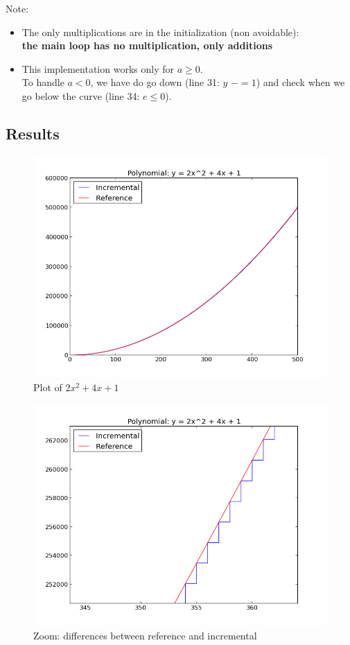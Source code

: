 \documentclass[a4paper,10pt]{article}
\begin{document}
\bigskip \noindent
Note:
\begin{itemize}
	\item The only multiplications are in the initialization (non avoidable): \\
	 \textbf{the main loop has no multiplication, only additions}
	\item This implementation works only for $a \ge 0$.
	\\To handle $a < 0$, we have do go down (line 31: $y$ $-$$= 1$) and check when we go below the curve (line 34: $e \le 0$).
\end{itemize}


\newpage
\subsection{Results}

\begin{figure}[!htb]\centering
    \includegraphics[width=0.8\linewidth]{./images/plot.png}
    \caption{\small{Plot of $2x^2 + 4x + 1$}}
\end{figure}

\begin{figure}[!htb]\centering
    \includegraphics[width=0.8\linewidth]{./images/zoom.png}
    \caption{\small{Zoom: differences between reference and incremental}}
\end{figure}
\end{document}
